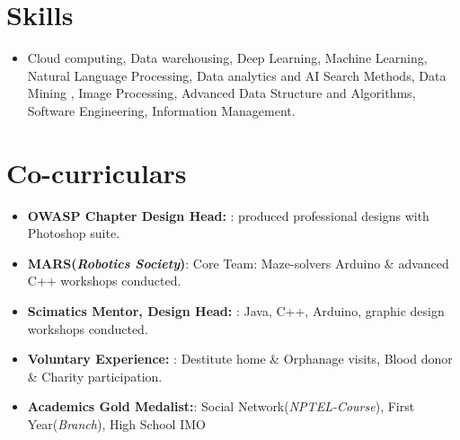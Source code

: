 \documentclass[letterpaper,12pt]{article}
\newcommand{\resumeItem}[2]{
  \item\small{
    \textbf{#1}{: #2 \vspace{-2pt}}
  }
}
\newcommand{\resumeSubItem}[2]{\resumeItem{#1}{#2}\vspace{-4pt}}
\newcommand{\resumeSubHeadingListStart}{\begin{itemize}[leftmargin=*]}
\newcommand{\resumeSubHeadingListEnd}{\end{itemize}}
\begin{document}
\section{Skills}
  \resumeSubHeadingListStart
    \item{
		 {Cloud computing}, {Data warehousing}, {Deep Learning}, {Machine Learning}, {Natural Language Processing}, {Data analytics and AI Search Methods}, {Data Mining} , {Image Processing}, {Advanced Data Structure and Algorithms}, {Software Engineering}, {Information Management}.
    }
  \resumeSubHeadingListEnd
  



\section{Co-curriculars}
  \resumeSubHeadingListStart

    \resumeSubItem{OWASP Chapter Design Head: }{produced professional designs with Photoshop 			suite.}
     \resumeSubItem{MARS(\textit{Robotics Society})}{ Core Team: Maze-solvers Arduino \& advanced C++ workshops conducted.}
    \resumeSubItem{Scimatics Mentor, Design Head: }
	{Java, C++, Arduino, graphic design workshops conducted.}
    \resumeSubItem{Voluntary Experience: }
	 {Destitute home \& Orphanage visits, Blood donor \& Charity participation.}
    \resumeSubItem{Academics Gold Medalist:}{Social Network(\textit{NPTEL-Course}), First Year(\textit{Branch}), High School IMO}

  \resumeSubHeadingListEnd


\end{document}
